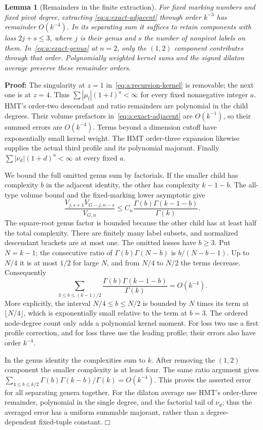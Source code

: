 \documentclass[a4paper,10pt]{article}
\numberwithin{equation}{section}
\theoremstyle{paperplain}
\newtheorem{lmm}[thm]{Lemma}
\theoremstyle{paperremark}
\theoremstyle{paperplain}
\newenvironment{prf}{\noindent \textbf{Proof: }}{\hfill $\mdlgwhtsquare$\par\addvspace{0.5\baselineskip}}
\begin{document}
\begin{lmm}[Remainders in the finite extraction]\label{lmm:a:extraction-tail}
For fixed marking numbers and fixed pivot degree, extracting
\eqref{eq:a:exact-adjacent} through order $k^{-3}$ has remainder
$O(k^{-4})$. In its separating sum it suffices to retain components
with loss $2j+s\leq3$, where $j$ is their genus and $s$ the number
of nonpivot labels on them. In~\eqref{eq:a:exact-genus} at $n=2$,
only the $(1,2)$ component contributes through that order.
Polynomially weighted kernel sums and the signed dilaton average
preserve these remainder orders.
\end{lmm}
\begin{prf}
The singularity at $z=1$ in~\eqref{eq:a:recursion-kernel} is removable;
the next one is at $z=4$. Thus $\sum|\mu_l|(1+l)^a<\infty$ for every
fixed nonnegative integer $a$. HMT's order-two descendant and ratio
remainders are polynomial in the child degrees. Their volume prefactors
in~\eqref{eq:a:exact-adjacent} are $O(k^{-1})$, so their summed errors
are $O(k^{-4})$. Terms beyond a dimension cutoff have exponentially
small kernel weight. The HMT order-three expansion likewise supplies
the actual third profile and its polynomial majorant. Finally
$\sum|\nu_d|(1+d)^a<\infty$ at every fixed $a$.

We bound the full omitted genus sum by factorials. If the smaller child
has complexity $b$ in the adjacent identity,
the other has complexity $k-1-b$. The all-type volume bound and the
fixed-marking lower asymptotic give
\[
 \frac{V_{j,s+1}V_{G-j,n-s}}{V_{G,n}}
 \leq C_n\frac{\Gamma(b)\Gamma(k-1-b)}{\Gamma(k)}.
\]
The square-root genus factor is bounded because the other child has
at least half the total complexity. There are finitely many label
subsets, and normalized descendant brackets are at most one.
The omitted losses have $b\geq3$. Put $N=k-1$; the consecutive ratio
of $\Gamma(b)\Gamma(N-b)$ is $b/(N-b-1)$. Up to $N/4$ it is at
most $1/2$ for large $N$, and from $N/4$ to $N/2$ the terms decrease.
Consequently
\[
 \sum_{3\leq b\leq(k-1)/2}
 \frac{\Gamma(b)\Gamma(k-1-b)}{\Gamma(k)}=O(k^{-4}).
\]
More explicitly, the interval $N/4\leq b\leq N/2$ is bounded by
$N$ times its term at $\lfloor N/4\rfloor$, which is exponentially
small relative to the term at $b=3$. The ordered node-degree count
only adds a polynomial kernel moment.
For loss two use a first profile correction, and for loss three use
the leading profile; their errors also have order $k^{-4}$.

In the genus identity the complexities sum to $k$. After removing
the $(1,2)$ component the smaller complexity is at least four.
The same ratio argument gives
$\sum_{4\leq b\leq k/2}\Gamma(b)\Gamma(k-b)/\Gamma(k)=O(k^{-4})$.
This proves the asserted error for all separating genera together.
For the dilaton average use HMT's order-three remainder, polynomial
in the single degree, and the factorial tail of $\nu_d$; thus the
averaged error has a uniform summable majorant, rather than a
degree-dependent fixed-tuple constant.
\end{prf}
\end{document}
